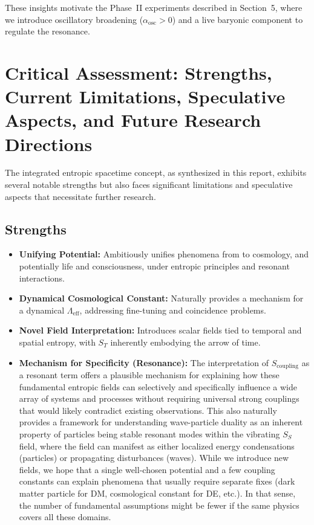 \documentclass[11pt,a4paper]{article} %
\newcommand{\ST}{S_T}
\newcommand{\SSp}{S_S} %
\newcommand{\Scoupling}{S_{\text{coupling}}}
\newcommand{\QGP}{\text{quark-gluon plasma}} %
\newcommand{\Lambdaeff}{\Lambda_{\text{eff}}}
\begin{document}
These insights motivate the Phase~II experiments described in Section~5, where we introduce oscillatory broadening ($\alpha_{\mathrm{osc}}>0$) and a live baryonic component to regulate the resonance.

\section{Critical Assessment: Strengths, Current Limitations, Speculative Aspects, and Future Research Directions}
The integrated entropic spacetime concept, as synthesized in this report, exhibits several notable strengths but also faces significant limitations and speculative aspects that necessitate further research.

\subsection{Strengths}
\begin{itemize}
    \item \textbf{Unifying Potential:} Ambitiously unifies phenomena from \QGP{} to cosmology, and potentially life and consciousness, under entropic principles and resonant interactions.
    \item \textbf{Dynamical Cosmological Constant:} Naturally provides a mechanism for a dynamical $\Lambdaeff$, addressing fine-tuning and coincidence problems.
    \item \textbf{Novel Field Interpretation:} Introduces scalar fields tied to temporal and spatial entropy, with $\ST$ inherently embodying the arrow of time.
    \item \textbf{Mechanism for Specificity (Resonance):} The interpretation of $\Scoupling$ as a resonant term offers a plausible mechanism for explaining how these fundamental entropic fields can selectively and specifically influence a wide array of systems and processes without requiring universal strong couplings that would likely contradict existing observations. This also naturally provides a framework for understanding wave-particle duality as an inherent property of particles being stable resonant modes within the vibrating $\SSp$ field, where the field can manifest as either localized energy condensations (particles) or propagating disturbances (waves). While we introduce new fields, we hope that a single well-chosen potential and a few coupling constants can explain phenomena that usually require separate fixes (dark matter particle for DM, cosmological constant for DE, etc.). In that sense, the number of fundamental assumptions might be fewer if the same physics covers all these domains.
\end{itemize}
\end{document}
